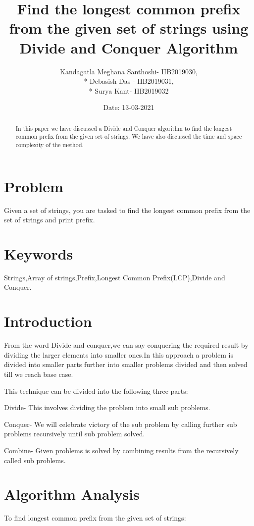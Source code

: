 \documentclass{article}
\title{\textbf{Find the longest common prefix from the given set of strings using Divide and Conquer Algorithm}}
\author{Kandagatla Meghana Santhoshi- IIB2019030,\\* Debasish Das - IIB2019031, \\* Surya Kant- IIB2019032 }
\date{Date: 13-03-2021}
\begin{document}
\maketitle
\begin{abstract}
In this paper we have discussed a Divide and Conquer
algorithm to find the longest common prefix from the given set of strings. We have also discussed the time and space complexity of the method.
\end{abstract}

\begin{multicols}{2}

\section{Problem}
Given a set of strings, you are tasked to find the longest common prefix from the set of strings and print prefix.

\section{Keywords}
Strings,Array of strings,Prefix,Longest Common Prefix(LCP),Divide and Conquer.

\section{Introduction}
From the word Divide and conquer,we can say conquering the required result by  dividing the larger elements into smaller ones.In this approach a problem is divided into smaller parts further into smaller problems divided and then solved till we reach base case.

This technique can be divided into the following three parts:

Divide- This involves dividing the problem into small sub problems.

Conquer- We will celebrate victory of the sub problem by calling further sub problems recursively until sub problem solved.

Combine- Given problems is solved by combining results from the recursively called sub problems.

\section{Algorithm Analysis}
To find longest common prefix from the given set of strings:
 

\end{multicols}
\end{document}

